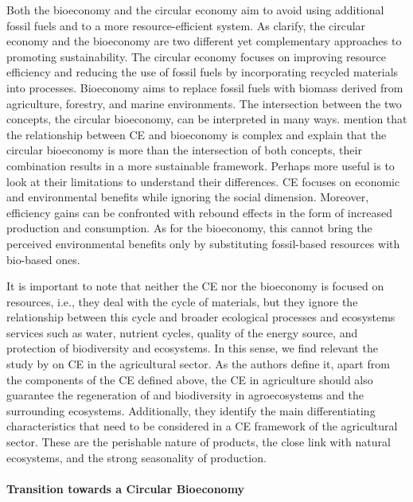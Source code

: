Both the bioeconomy and the circular economy aim to avoid using additional fossil fuels and to a more resource-efficient system. As \cite{carus2018circular} clarify, the circular economy and the bioeconomy are two different yet complementary approaches to promoting sustainability. The circular economy focuses on improving resource efficiency and reducing the use of fossil fuels by incorporating recycled materials into processes. Bioeconomy aims to replace fossil fuels with biomass derived from agriculture, forestry, and marine environments. The intersection between the two concepts, the circular bioeconomy, can be interpreted in many ways. \cite{tan2021circular} mention that the relationship between CE and bioeconomy is complex and explain that the circular bioeconomy is more than the intersection of both concepts, their combination results in a more sustainable framework. Perhaps more useful is to look at their limitations to understand their differences. CE focuses on economic and environmental benefits while ignoring the social dimension. Moreover, efficiency gains can be confronted with rebound effects in the form of increased production and consumption. As for the bioeconomy, this cannot bring the perceived environmental benefits only by substituting fossil-based resources with bio-based ones.

It is important to note that neither the CE nor the bioeconomy is focused on resources, i.e., they deal with the cycle of materials, but they ignore the relationship between this cycle and broader ecological processes and ecosystems services such as water, nutrient cycles, quality of the energy source, and protection of biodiversity and ecosystems. In this sense, we find relevant the study by \cite{velasco2021circular} on CE in the agricultural sector. As the authors define it, apart from the components of the CE defined above, the CE in agriculture should also guarantee the regeneration of and biodiversity in agroecosystems and the surrounding ecosystems. Additionally, they identify the main differentiating characteristics that need to be considered in a CE framework of the agricultural sector. These are the perishable nature of products, the close link with natural ecosystems, and the strong seasonality of production. 


\paragraph{Transition towards a Circular Bioeconomy} \mbox{}\\

